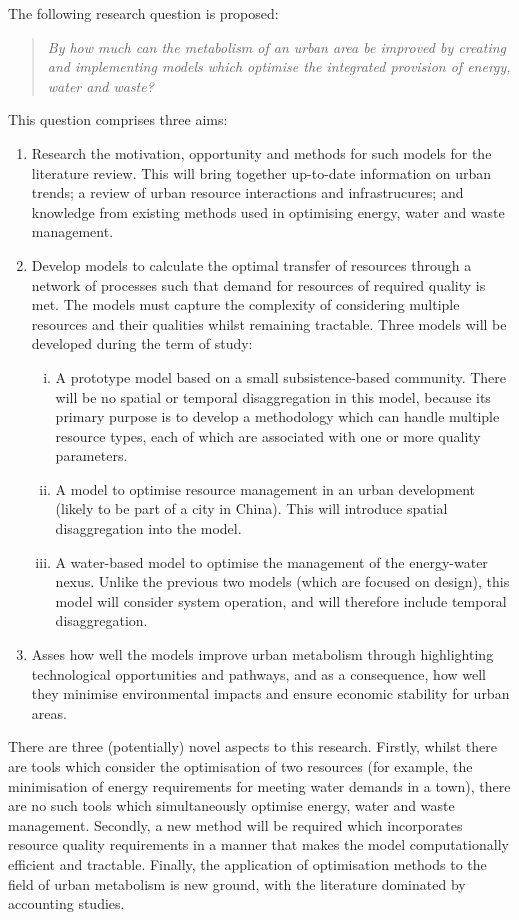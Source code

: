 The following research question is proposed:
\begin{quote}
	\emph{By how much can the metabolism of an urban area be improved by creating and implementing models which optimise the integrated provision of energy, water and waste?}
\end{quote}
This question comprises three aims:
\begin{enumerate}
	\item Research the motivation, opportunity and methods for such models for the literature review. This will bring together up-to-date information on urban trends; a review of urban resource interactions and infrastrucures; and knowledge from existing methods used in optimising energy, water and waste management.
	\item Develop models to calculate the optimal transfer of resources through a network of processes such that demand for resources of required quality is met. The models must capture the complexity of considering multiple resources and their qualities whilst remaining tractable. Three models will be developed during the term of study:
		\begin{enumerate}[(i)]
			\item A prototype model based on a small subsistence-based community. There will be no spatial or temporal disaggregation in this model, because its primary purpose is to develop a methodology which can handle multiple resource types, each of which are associated with one or more quality parameters.
			\item A model to optimise resource management in an urban development (likely to be part of a city in China). This will introduce spatial disaggregation into the model.
			\item A water-based model to optimise the management of the energy-water nexus. Unlike the previous two models (which are focused on design), this model will consider system operation, and will therefore include temporal disaggregation.
		\end{enumerate}
	\item Asses how well the models improve urban metabolism through highlighting technological opportunities and pathways, and as a consequence, how well they minimise environmental impacts and ensure economic stability for urban areas.
\end{enumerate}

There are three (potentially) novel aspects to this research. Firstly, whilst there are tools which consider the optimisation of two resources (for example, the minimisation of energy requirements for meeting water demands in a town), there are no such tools which simultaneously optimise energy, water and waste management. Secondly, a new method will be required which incorporates resource quality requirements in a manner that makes the model computationally efficient and tractable. Finally, the application of optimisation methods to the field of urban metabolism is new ground, with the literature dominated by accounting studies.

